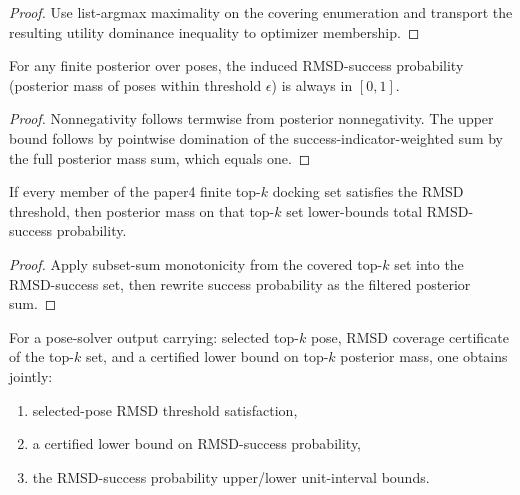 \begin{proof}
Use list-argmax maximality on the covering enumeration and transport the resulting utility dominance inequality to optimizer membership.
\end{proof}

\begin{theorem}\label{thm:rmsd-success-probability-unit-interval}
For any finite posterior over poses, the induced RMSD-success probability (posterior mass of poses within threshold $\epsilon$) is always in $[0,1]$.
\end{theorem}

\begin{proof}
Nonnegativity follows termwise from posterior nonnegativity. The upper bound follows by pointwise domination of the success-indicator-weighted sum by the full posterior mass sum, which equals one.
\end{proof}

\begin{theorem}\label{thm:topk-mass-lower-bound-rmsd-success-probability}
If every member of the paper4 finite top-$k$ docking set satisfies the RMSD threshold, then posterior mass on that top-$k$ set lower-bounds total RMSD-success probability.
\end{theorem}

\begin{proof}
Apply subset-sum monotonicity from the covered top-$k$ set into the RMSD-success set, then rewrite success probability as the filtered posterior sum.
\end{proof}

\begin{theorem}\label{thm:rmsd-probability-derived-pose-solver-bundle}
For a pose-solver output carrying: selected top-$k$ pose, RMSD coverage certificate of the top-$k$ set, and a certified lower bound on top-$k$ posterior mass, one obtains jointly:
\begin{enumerate}
\item selected-pose RMSD threshold satisfaction,
\item a certified lower bound on RMSD-success probability,
\item the RMSD-success probability upper/lower unit-interval bounds.
\end{enumerate}
\end{theorem}

